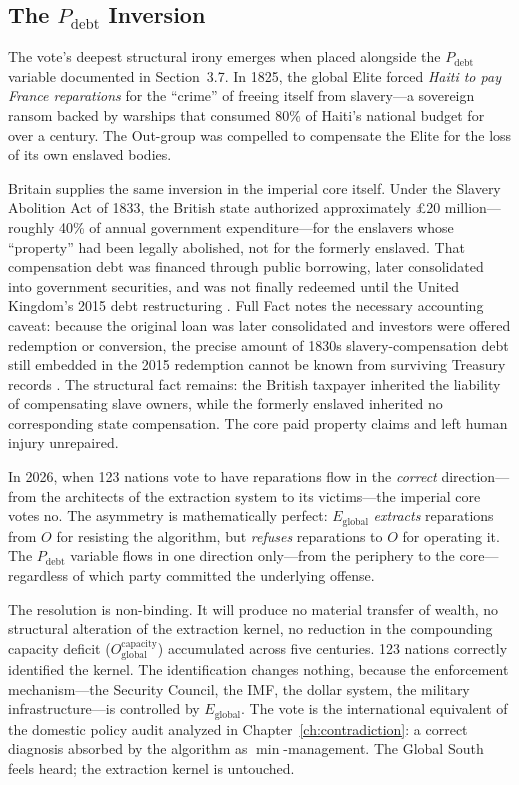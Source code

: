 \subsection{The \texorpdfstring{$P_{\text{debt}}$}{P\_debt} Inversion}

The vote's deepest structural irony emerges when placed alongside the $P_{\text{debt}}$ variable documented in Section~3.7. In 1825, the global Elite forced \textit{Haiti to pay France reparations} for the ``crime'' of freeing itself from slavery---a sovereign ransom backed by warships that consumed 80\% of Haiti's national budget for over a century. The Out-group was compelled to compensate the Elite for the loss of its own enslaved bodies.

Britain supplies the same inversion in the imperial core itself. Under the Slavery Abolition Act of 1833, the British state authorized approximately \pounds20 million---roughly 40\% of annual government expenditure---for the enslavers whose ``property'' had been legally abolished, not for the formerly enslaved. That compensation debt was financed through public borrowing, later consolidated into government securities, and was not finally redeemed until the United Kingdom's 2015 debt restructuring \cite{fullfact_slavery_compensation_loan, taxjustice_slave_compensation_loan, olusoga_treasury_tweet}. Full Fact notes the necessary accounting caveat: because the original loan was later consolidated and investors were offered redemption or conversion, the precise amount of 1830s slavery-compensation debt still embedded in the 2015 redemption cannot be known from surviving Treasury records \cite{fullfact_slavery_compensation_loan}. The structural fact remains: the British taxpayer inherited the liability of compensating slave owners, while the formerly enslaved inherited no corresponding state compensation. The core paid property claims and left human injury unrepaired.

In 2026, when 123 nations vote to have reparations flow in the \textit{correct} direction---from the architects of the extraction system to its victims---the imperial core votes no. The asymmetry is mathematically perfect: $E_{\text{global}}$ \textit{extracts} reparations from $O$ for resisting the algorithm, but \textit{refuses} reparations to $O$ for operating it. The $P_{\text{debt}}$ variable flows in one direction only---from the periphery to the core---regardless of which party committed the underlying offense.

The resolution is non-binding. It will produce no material transfer of wealth, no structural alteration of the extraction kernel, no reduction in the compounding capacity deficit ($O_{\text{global}}^{\text{capacity}}$) accumulated across five centuries. 123 nations correctly identified the kernel. The identification changes nothing, because the enforcement mechanism---the Security Council, the IMF, the dollar system, the military infrastructure---is controlled by $E_{\text{global}}$. The vote is the international equivalent of the domestic policy audit analyzed in Chapter~\ref{ch:contradiction}: a correct diagnosis absorbed by the algorithm as $\min$-management. The Global South feels heard; the extraction kernel is untouched.

